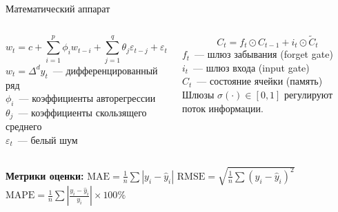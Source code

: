 \begin{frame}[shrink=15]{Математический аппарат}

  \begin{columns}[T]
    \begin{tcolorbox}[formulabox, title={\faEquals\ ARIMA$(p,d,q)$}, equal height group=formulas]
      \[
        w_t = c + \sum_{i=1}^{p} \phi_i w_{t-i} + \sum_{j=1}^{q} \theta_j \varepsilon_{t-j} + \varepsilon_t
      \]
      \small
      $w_t = \Delta^d y_t$~--- дифференцированный ряд\\
      $\phi_i$~--- коэффициенты авторегрессии\\
      $\theta_j$~--- коэффициенты скользящего среднего\\
      $\varepsilon_t$~--- белый шум
    \end{tcolorbox}

    \begin{tcolorbox}[formulabox, title={\faBrain\ LSTM: обновление памяти}, equal height group=formulas]
      \[
        C_t = f_t \odot C_{t-1} + i_t \odot \tilde{C}_t
      \]
      \small
      $f_t$~--- шлюз забывания (forget gate)\\
      $i_t$~--- шлюз входа (input gate)\\
      $C_t$~--- состояние ячейки (память)\\[4pt]
      Шлюзы $\sigma(\cdot)\in[0,1]$ регулируют поток информации.
    \end{tcolorbox}
  \end{columns}

  \vspace{0.3cm}
  \begin{tcolorbox}[infobox]
    \small \textbf{Метрики оценки:}\quad
    $\text{MAE} = \frac{1}{n}\sum|y_i - \hat{y}_i|$\qquad
    $\text{RMSE} = \sqrt{\frac{1}{n}\sum(y_i - \hat{y}_i)^2}$\qquad
    $\text{MAPE} = \frac{1}{n}\sum\left|\frac{y_i - \hat{y}_i}{y_i}\right| \times 100\%$
  \end{tcolorbox}
\end{frame}
